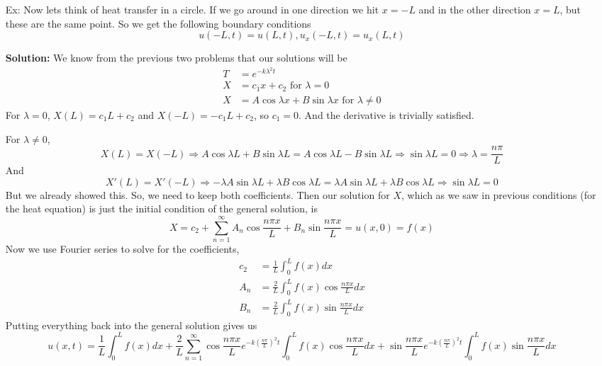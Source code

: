 \documentclass[reqno]{amsart}
\theoremstyle{definition}
\begin{document}
\begin{itemize}
\item[Ex:  ]  Now lets think of heat transfer in a circle.  If we go around
in one direction we hit $x = -L$ and in the other direction $x = L$, but these
are the same point.  So we get the following boundary conditions
%
\begin{equation}
u(-L,t) = u(L,t), u_x(-L,t) = u_x(L,t)
\end{equation}

\textbf{Solution:  }  We know from the previous two problems that
our solutions will be
%
\begin{align*}
T &= e^{-k\lambda^2 t}\\
X &= c_1x + c_2 \text{  for $\lambda = 0$}\\
X &= A\cos\lambda x + B\sin\lambda x \text{  for $\lambda \neq 0$}
\end{align*}
%
For $\lambda = 0$, $X(L) = c_1L + c_2$ and $X(-L) = -c_1L + c_2$, so $c_1 = 0$.
And the derivative is trivially satisfied.

For $\lambda \neq 0$,
%
\begin{equation*}
X(L) = X(-L) \Rightarrow A\cos\lambda L + B\sin\lambda L = A\cos\lambda L - B\sin\lambda L
\Rightarrow \sin\lambda L = 0 \Rightarrow \lambda = \frac{n\pi}{L}
\end{equation*}
%
And
%
\begin{equation*}
X'(L) = X'(-L) \Rightarrow -\lambda A\sin\lambda L + \lambda B\cos\lambda L
= \lambda A\sin \lambda L + \lambda B\cos\lambda L \Rightarrow \sin\lambda L = 0
\end{equation*}
%
But we already showed this.  So, we need to keep both coefficients.
%
Then our solution for $X$, which as we saw in previous conditions (for the heat equation)
is just the initial condition of the general solution, is
%
\begin{equation}
X = c_2 + \sum_{n=1}^\infty A_n\cos\frac{n\pi x}{L} + B_n\sin\frac{n\pi x}{L} = u(x,0) = f(x)
\end{equation}
%
Now we use Fourier series to solve for the coefficients,
%
\begin{align*}
c_2 &= \frac{1}{L}\int_0^L f(x)dx\\
A_n &= \frac{2}{L}\int_0^L f(x)\cos\frac{n\pi x}{L}dx\\
B_n &= \frac{2}{L}\int_0^L f(x)\sin\frac{n\pi x}{L}dx
\end{align*}
%
Putting everything back into the general solution gives us
%
\begin{equation}
u(x,t) = \frac{1}{L}\int_0^L f(x)dx + \frac{2}{L}\sum_{n=1}^\infty
\cos\frac{n\pi x}{L}e^{-k\left(\frac{n\pi}{L}\right)^2 t}\int_0^L f(x)\cos\frac{n\pi x}{L}dx
+ \sin\frac{n\pi x}{L}e^{-k\left(\frac{n\pi}{L}\right)^2 t}\int_0^L f(x)\sin\frac{n\pi x}{L}dx
\end{equation}

\end{itemize}
\end{document}
